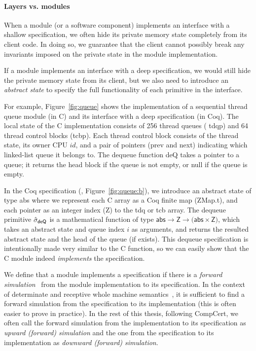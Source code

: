 \paragraph{Layers vs. modules} 
When a module (or a software component)
implements an interface with a shallow specification, 
we often hide its private memory state completely
from its client code. In doing so, we guarantee that the client
cannot possibly break any invariants imposed on the private state
in the module implementation.

If a module implements an interface with a deep specification, we
would still hide the private memory state from its client, but we also
need to introduce an {\em abstract state} to specify
the full functionality of each primitive in the interface. 

For example, Figure~\ref{fig:queue} shows the implementation of a
sequential thread queue module (in C) and its interface with a deep
specification (in Coq). The local state of the C implementation
consists of 256 thread queues (%
\textsf{tdqp}) and 64 thread control blocks
(\textsf{tcbp}).  Each thread control block consists of the thread state, its owner CPU $id$,
and a pair of pointers (\textsf{prev} and \textsf{next}) indicating which
linked-list queue it belongs to. The dequeue  function 
\textsf{deQ}
takes a pointer to a queue; it returns the head block if the queue
is not empty, or null if the queue is empty.

In the Coq specification (\cf, Figure~\ref{fig:queue:b}), we introduce an abstract state
of type \textsf{abs} where we represent each C array as a Coq finite map
(\textsf{ZMap.t}), and each pointer as an integer index (\textsf{Z}) to the
\textsf{tdq} or \textsf{tcb} array. The dequeue primitive 
$\hat{\sigma}_\textsf{deQ}$ is
a mathematical function of type $\textsf{abs} \rightarrow \textsf{Z}
\rightarrow \textsf{(abs}\times \textsf{Z)}$,
which takes an abstract state and queue index $i$ as arguments,
and returns the resulted abstract state and the head of the queue (if exists).  This
dequeue specification is intentionally made very similar to the C
function, so we can easily show that the C module indeed {\em
  implements} the specification. 

We define that a module implements a specification if there is a
{\em forward simulation}~\cite{Lynch95} from the module implementation to its
specification. In the context of determinate and receptive 
whole machine semantics~\cite{sevcik13,Leroy-backend},
it is sufficient to find
a forward simulation from the specification to its
implementation (this is often easier to prove in practice). 
In the rest of this thesis, following CompCert, we often call the
forward simulation from the implementation to its specification
as {\em upward (forward) simulation} and the one from the specification
to its implementation as {\em downward (forward) simulation}.

